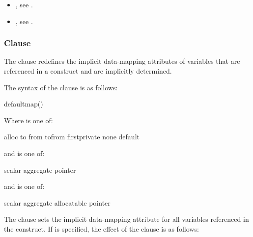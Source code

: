 \crossreferences
\begin{itemize}
\item {}, see
.

\item {}, see
.
\end{itemize}




\subsubsection{ Clause}
\label{subsubsec:defaultmap clause}

\summary

The  clause redefines the implicit data-mapping attributes of
variables that are referenced in a  construct and are implicitly
determined.

\syntax
The syntax of the  clause is as follows:

\begin{ompSyntax}
  defaultmap()
\end{ompSyntax}

Where  is one of:
\begin{indentedcodelist}
  alloc
  to
  from
  tofrom
  firstprivate
  none
  default
\end{indentedcodelist}

\begin{ccppspecific}
and  is one of:
\begin{indentedcodelist}
  scalar
  aggregate
  pointer
\end{indentedcodelist}
\end{ccppspecific}

\begin{fortranspecific}
and  is one of:
\begin{indentedcodelist}
  scalar
  aggregate
  allocatable
  pointer
\end{indentedcodelist}
\end{fortranspecific}

\descr
The  clause sets the implicit data-mapping attribute for all variables
referenced in the construct. If  is specified, the effect of
the  clause is as follows:

